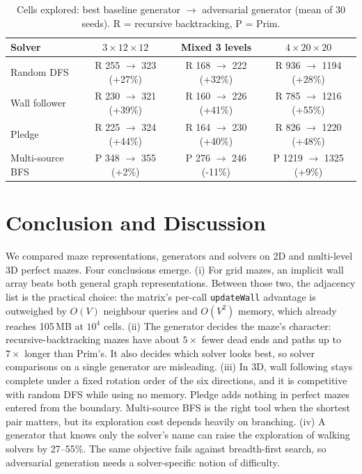 \begin{table}[t]
  \centering
  \caption{Cells explored: best baseline generator $\rightarrow$ adversarial generator (mean of 30 seeds). R = recursive backtracking, P = Prim.}
  \label{tab:adversarial}
  \small
  \setlength{\tabcolsep}{4pt}
  \begin{tabular}{lccc}
    \toprule
    Solver & $3\times12\times12$ & Mixed 3 levels & $4\times20\times20$ \\
    \midrule
    Random DFS       & R 255 $\rightarrow$ 323 (+27\%) & R 168 $\rightarrow$ 222 (+32\%) & R 936 $\rightarrow$ 1194 (+28\%) \\
    Wall follower    & R 230 $\rightarrow$ 321 (+39\%) & R 160 $\rightarrow$ 226 (+41\%) & R 785 $\rightarrow$ 1216 (+55\%) \\
    Pledge           & R 225 $\rightarrow$ 324 (+44\%) & R 164 $\rightarrow$ 230 (+40\%) & R 826 $\rightarrow$ 1220 (+48\%) \\
    Multi-source BFS & P 348 $\rightarrow$ 355 (+2\%)  & P 276 $\rightarrow$ 246 (-11\%) & P 1219 $\rightarrow$ 1325 (+9\%) \\
    \bottomrule
  \end{tabular}
\end{table}

\section{Conclusion and Discussion}
\label{sec:conclusion}

We compared maze representations, generators and solvers on 2D and multi-level 3D perfect mazes.
Four conclusions emerge.
(i) For grid mazes, an implicit wall array beats both general graph representations.
Between those two, the adjacency list is the practical choice: the matrix's per-call \texttt{updateWall} advantage is outweighed by $O(V)$ neighbour queries and $O(V^2)$ memory, which already reaches 105\,MB at $10^4$ cells.
(ii) The generator decides the maze's character: recursive-backtracking mazes have about $5\times$ fewer dead ends and paths up to $7\times$ longer than Prim's.
It also decides which solver looks best, so solver comparisons on a single generator are misleading.
(iii) In 3D, wall following stays complete under a fixed rotation order of the six directions, and it is competitive with random DFS while using no memory.
Pledge adds nothing in perfect mazes entered from the boundary.
Multi-source BFS is the right tool when the shortest pair matters, but its exploration cost depends heavily on branching.
(iv) A generator that knows only the solver's name can raise the exploration of walking solvers by 27--55\%.
The same objective fails against breadth-first search, so adversarial generation needs a solver-specific notion of difficulty.

